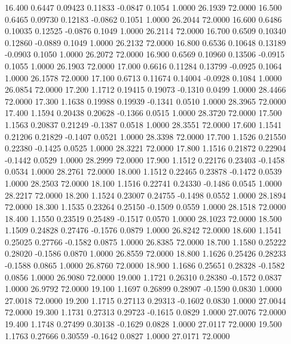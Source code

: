   16.400   0.6447   0.09423   0.11833  -0.0847   0.1054   1.0000  26.1939  72.0000
  16.500   0.6465   0.09730   0.12183  -0.0862   0.1051   1.0000  26.2044  72.0000
  16.600   0.6486   0.10035   0.12525  -0.0876   0.1049   1.0000  26.2114  72.0000
  16.700   0.6509   0.10340   0.12860  -0.0889   0.1049   1.0000  26.2132  72.0000
  16.800   0.6536   0.10648   0.13189  -0.0903   0.1050   1.0000  26.2072  72.0000
  16.900   0.6569   0.10960   0.13506  -0.0915   0.1055   1.0000  26.1903  72.0000
  17.000   0.6616   0.11284   0.13799  -0.0925   0.1064   1.0000  26.1578  72.0000
  17.100   0.6713   0.11674   0.14004  -0.0928   0.1084   1.0000  26.0854  72.0000
  17.200   1.1712   0.19415   0.19073  -0.1310   0.0499   1.0000  28.4466  72.0000
  17.300   1.1638   0.19988   0.19939  -0.1341   0.0510   1.0000  28.3965  72.0000
  17.400   1.1594   0.20438   0.20628  -0.1366   0.0515   1.0000  28.3720  72.0000
  17.500   1.1563   0.20837   0.21249  -0.1387   0.0518   1.0000  28.3551  72.0000
  17.600   1.1541   0.21206   0.21829  -0.1407   0.0521   1.0000  28.3398  72.0000
  17.700   1.1526   0.21550   0.22380  -0.1425   0.0525   1.0000  28.3221  72.0000
  17.800   1.1516   0.21872   0.22904  -0.1442   0.0529   1.0000  28.2999  72.0000
  17.900   1.1512   0.22176   0.23403  -0.1458   0.0534   1.0000  28.2761  72.0000
  18.000   1.1512   0.22465   0.23878  -0.1472   0.0539   1.0000  28.2503  72.0000
  18.100   1.1516   0.22741   0.24330  -0.1486   0.0545   1.0000  28.2217  72.0000
  18.200   1.1524   0.23007   0.24755  -0.1498   0.0552   1.0000  28.1894  72.0000
  18.300   1.1535   0.23264   0.25150  -0.1509   0.0559   1.0000  28.1518  72.0000
  18.400   1.1550   0.23519   0.25489  -0.1517   0.0570   1.0000  28.1023  72.0000
  18.500   1.1509   0.24828   0.27476  -0.1576   0.0879   1.0000  26.8242  72.0000
  18.600   1.1541   0.25025   0.27766  -0.1582   0.0875   1.0000  26.8385  72.0000
  18.700   1.1580   0.25222   0.28020  -0.1586   0.0870   1.0000  26.8559  72.0000
  18.800   1.1626   0.25426   0.28233  -0.1588   0.0865   1.0000  26.8760  72.0000
  18.900   1.1686   0.25651   0.28328  -0.1582   0.0856   1.0000  26.9080  72.0000
  19.000   1.1721   0.26310   0.28380  -0.1572   0.0837   1.0000  26.9792  72.0000
  19.100   1.1697   0.26899   0.28907  -0.1590   0.0830   1.0000  27.0018  72.0000
  19.200   1.1715   0.27113   0.29313  -0.1602   0.0830   1.0000  27.0044  72.0000
  19.300   1.1731   0.27313   0.29723  -0.1615   0.0829   1.0000  27.0076  72.0000
  19.400   1.1748   0.27499   0.30138  -0.1629   0.0828   1.0000  27.0117  72.0000
  19.500   1.1763   0.27666   0.30559  -0.1642   0.0827   1.0000  27.0171  72.0000
